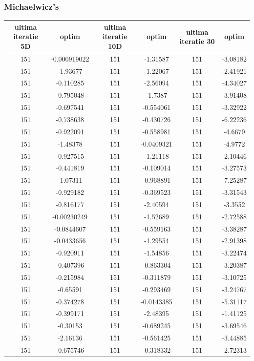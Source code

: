 \documentclass{article}
\begin{document}
\subsubsection{Michaelwicz’s}
\begin{tabular}{cccccc}
\hline
ultima iteratie 5D& optim&ultima iteratie 10D& optim&ultima iteratie 30&optim\\
\hline
151&-0.000919022&151&-1.31587&151&-3.08182 \\ \hline
151&-1.93677&151&-1.22067&151&-2.41921 \\ \hline
151&-0.110285&151&-2.56094&151&-4.34027 \\ \hline
151&-0.795048&151&-1.7387&151&-3.91408 \\ \hline
151&-0.697541&151&-0.554061&151&-3.32922 \\ \hline
151&-0.738638&151&-0.430726&151&-6.22236 \\ \hline
151&-0.922091&151&-0.558981&151&-4.6679 \\ \hline
151&-1.48378&151&-0.0409321&151&-4.9772 \\ \hline
151&-0.927515&151&-1.21118&151&-2.10446 \\ \hline
151&-0.441819&151&-0.109014&151&-3.27573 \\ \hline
151&-1.07311&151&-0.968891&151&-7.25287 \\ \hline
151&-0.929182&151&-0.369523&151&-3.31543 \\ \hline
151&-0.816177&151&-2.40594&151&-3.3552 \\ \hline
151&-0.00230249&151&-1.52689&151&-2.72588 \\ \hline
151&-0.0844607&151&-0.559163&151&-3.38287 \\ \hline
151&-0.0433656&151&-1.29554&151&-2.91398 \\ \hline
151&-0.920911&151&-1.54856&151&-3.22474 \\ \hline
151&-0.407396&151&-0.863304&151&-3.20387 \\ \hline
151&-0.215984&151&-0.311879&151&-3.10725 \\ \hline
151&-0.65591&151&-0.293469&151&-3.24767 \\ \hline
151&-0.374278&151&-0.0143385&151&-5.31117 \\ \hline
151&-0.399171&151&-2.48395&151&-1.41125 \\ \hline
151&-0.30153&151&-0.689245&151&-3.69546 \\ \hline
151&-2.16136&151&-0.561425&151&-3.44885 \\ \hline
151&-0.675746&151&-0.318332&151&-2.72313 \\ \hline

\end{tabular}
\end{document}
